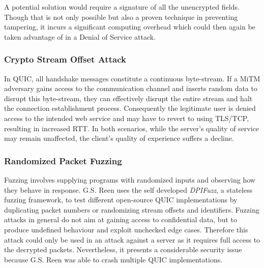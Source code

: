 A potential solution would require a signature of all the unencrypted fields. Though that is not only possible but also a proven technique in preventing tampering, it incurs a significant computing overhead which could then again be taken advantage of in a Denial of Service attack.

\subsubsection{Crypto Stream Offset Attack}

In QUIC, all handshake messages constitute a continuous byte-stream. If a MiTM adversary gains access to the communication channel and inserts random data to disrupt this byte-stream, they can effectively disrupt the entire stream and halt the connection establishment process. Consequently the legitimate user is denied access to the intended web service and may have to revert to using TLS/TCP, resulting in increased RTT. In both scenarios, while the server's quality of service may remain unaffected, the client's quality of experience suffers a decline.

\subsubsection{Randomized Packet Fuzzing}

Fuzzing involves supplying programs with randomized inputs and observing how they behave in response. G.S. Reen \cite{quic_security_3} uses the self developed \textit{DPIFuzz}, a stateless fuzzing framework, to test different open-source QUIC implementations by duplicating packet numbers or randomizing stream offsets and identifiers. Fuzzing attacks in general do not aim at gaining access to confidential data, but to produce undefined behaviour and exploit unchecked edge cases. Therefore this attack could only be used in an attack against a server as it requires full access to the decrypted packets. Nevertheless, it presents a considerable security issue because G.S. Reen was able to crash multiple QUIC implementations.